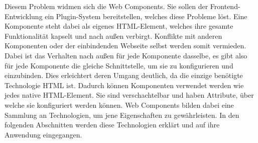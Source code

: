 Diesem Problem widmen sich die Web Components. Sie sollen der Frontend-Entwicklung ein Plugin-System bereitstellen, welches diese Probleme löst. Eine Komponente steht dabei als eigenes \ac{HTML}-Element, welches ihre gesamte Funktionalität kapselt und nach außen verbirgt. Konflikte mit anderen Komponenten oder der einbindenden Webseite selbst werden somit vermieden. Dabei ist das Verhalten nach außen für jede Komponente dasselbe, es gibt also für jede Komponente die gleiche Schnittstelle, um sie zu konfigurieren und einzubinden. Dies erleichtert deren Umgang deutlich, da die einzige benötigte Technologie \ac{HTML} ist. Dadurch können Komponenten verwendet werden wie jedes native \ac{HTML}-Element. Sie sind verschachtelbar und haben Attribute, über welche sie konfiguriert werden können. Web Components bilden dabei eine Sammlung an Technologien, um jene Eigenschaften zu gewährleisten. In den folgenden Abschnitten werden diese Technologien erklärt und auf ihre Anwendung eingegangen.
